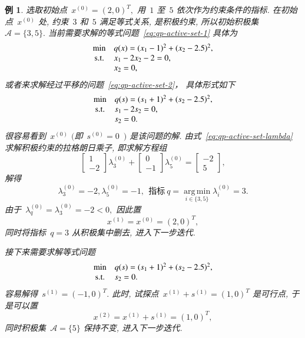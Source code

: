 \documentclass{SBCbookchapter}
\DeclareMathOperator*{\argmin}{arg\,min}
\newtheorem{exam}[thm]{例}
\numberwithin{equation}{section}
\begin{document}
\begin{exam}
选取初始点~${x}^{(0)} = (2, 0)^T,$ 用~$1$ 至~$5$ 依次作为约束条件的指标. 在初始点~${x}^{(0)}$ 处, 约束~$3$ 和~$5$ 满足等式关系, 是积极约束, 所以初始积极集~$\mathcal{A} = \{ 3, 5 \}.$ 当前需要求解的等式问题~\eqref{eq:qp-active-set-1} 具体为
\begin{equation*}
\begin{array}{cl}
\min & q({x}) = (x_1 - 1)^2 + (x_2 - 2.5)^2, \\
{\rm s.t.} & x_1 - 2x_2 - 2 = 0, \\
& x_2 = 0,
\end{array}
\end{equation*}
或者来求解经过平移的问题~\eqref{eq:qp-active-set-2}， 具体形式如下
\begin{equation}
\label{eq:qp-active-set-eg-problem}
\begin{array}{cl}
\min & q({s}) = (s_1 + 1)^2 + (s_2 - 2.5)^2, \\
{\rm s.t.} & s_1 - 2s_2 = 0, \\
& s_2 = 0.
\end{array}
\end{equation}
很容易看到~${x}^{(0)}$ $($即~${s}^{(0)} = {0}$~$)$ 是该问题的解.
由式~\eqref{eq:qp-active-set-lambda} 求解积极约束的拉格朗日乘子, 即求解方程组
\begin{equation*}
\begin{bmatrix} 1 \\ -2 \end{bmatrix} \lambda_3^{(0)} + \begin{bmatrix} 0 \\ -1 \end{bmatrix} \lambda_5^{(0)} = \begin{bmatrix} -2 \\ 5 \end{bmatrix},
\end{equation*}
解得
\begin{equation*}
\lambda_3^{(0)} = -2, \lambda_5^{(0)} = -1, ~~\text{指标}~ q = \argmin\limits_{i \in \{ 3, 5 \}} \lambda_i^{(0)} = 3.
\end{equation*}
由于~$\lambda_q^{(0)} = \lambda_3^{(0)} = -2 < 0,$ 因此置
\begin{equation*}
{x}^{(1)} = {x}^{(0)} = (2, 0)^T,
\end{equation*}
同时将指标~$q = 3$ 从积极集中删去, 进入下一步迭代.

接下来需要求解等式问题
\begin{equation*}
\begin{array}{cl}
\min & q({s}) = (s_1 + 1)^2 + (s_2 - 2.5)^2, \\
{\rm s.t.} & s_2 = 0.
\end{array}
\end{equation*}
容易解得~${s}^{(1)} = (-1, 0)^T.$ 此时, 试探点~${x}^{(1)} + {s}^{(1)} = (1, 0)^T$ 是可行点, 于是可以置
\begin{equation*}
{x}^{(2)} = {x}^{(1)} + {s}^{(1)} = (1, 0)^T,
\end{equation*}
同时积极集~$\mathcal{A} = \{ 5 \}$ 保持不变, 进入下一步迭代.


\end{exam}
\end{document}
